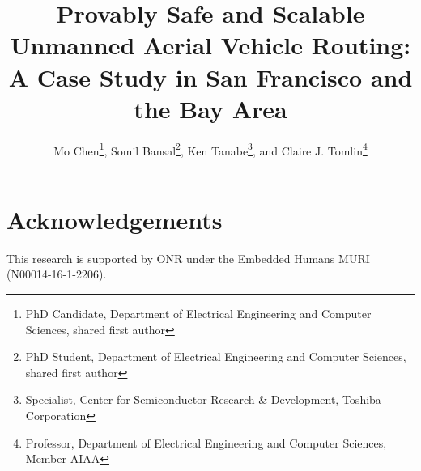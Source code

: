 \documentclass[submit]{aiaa-pretty}
\title{\LARGE \bf Provably Safe and Scalable Unmanned Aerial Vehicle Routing: A Case Study in San Francisco and the Bay Area}
\author{Mo Chen\thanks{PhD Candidate, Department of Electrical Engineering and Computer Sciences, shared first author}, Somil Bansal\thanks{PhD Student, Department of Electrical Engineering and Computer Sciences, shared first author}, Ken Tanabe\thanks{Specialist, Center for Semiconductor Research \& Development, Toshiba Corporation}, and Claire J. Tomlin\thanks{Professor, Department of Electrical Engineering and Computer Sciences, Member AIAA}
}
\begin{document}
\maketitle





















\section*{Acknowledgements}
This research is supported by ONR under the Embedded Humans MURI (N00014-16-1-2206).




\end{document}
